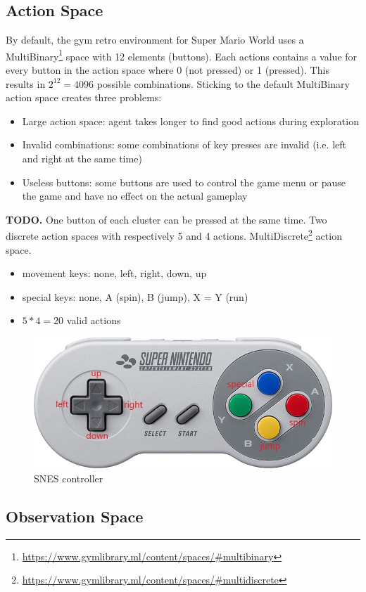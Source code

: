 \documentclass{article}
\begin{document}
    \subsection{Action Space}
    By default, the gym retro environment for Super Mario World uses a MultiBinary\footnote{\url{https://www.gymlibrary.ml/content/spaces/\#multibinary}} space with 12 elements (buttons).
    Each actions contains a value for every button in the action space where 0 (not pressed) or 1 (pressed). This results in $2^{12}=4096$ possible combinations.
    Sticking to the default MultiBinary action space creates three problems:
    \begin{itemize}
        \item Large action space: agent takes longer to find good actions during exploration
        \item Invalid combinations: some combinations of key presses are invalid (i.e. left and right at the same time)
        \item Useless buttons: some buttons are used to control the game menu or pause the game and have no effect on the actual gameplay
    \end{itemize}
    \textbf{TODO.}
    One button of each cluster can be pressed at the same time.
    Two discrete action spaces with respectively 5 and 4 actions.
    MultiDiscrete\footnote{\url{https://www.gymlibrary.ml/content/spaces/\#multidiscrete}} action space.
    \begin{itemize}
        \item movement keys: none, left, right, down, up
        \item special keys: none, A (spin), B (jump), X = Y (run)
        \item $5*4=20$ valid actions 
    \end{itemize}
    \begin{figure}[H]
        \centering
        \includegraphics[width=.75\textwidth]{snes-controller-annot}
        \caption{SNES controller}
        \label{fig:snes-controller}
    \end{figure}
    \subsection{Observation Space}
\end{document}
